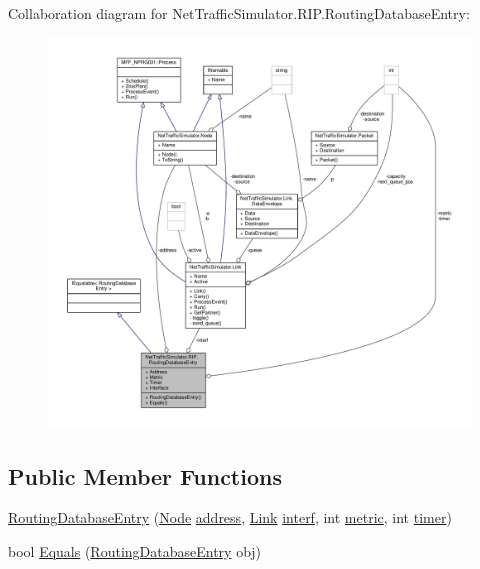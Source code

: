 Collaboration diagram for Net\-Traffic\-Simulator.\-R\-I\-P.\-Routing\-Database\-Entry\-:\nopagebreak
\begin{figure}[H]
\begin{center}
\leavevmode
\includegraphics[width=350pt]{classNetTrafficSimulator_1_1RIP_1_1RoutingDatabaseEntry__coll__graph}
\end{center}
\end{figure}
\subsection*{Public Member Functions}
\begin{DoxyCompactItemize}
\item 
\hyperlink{classNetTrafficSimulator_1_1RIP_1_1RoutingDatabaseEntry_afaa94cc84429fbf21ab78b77b3026627}{Routing\-Database\-Entry} (\hyperlink{classNetTrafficSimulator_1_1Node}{Node} \hyperlink{classNetTrafficSimulator_1_1RIP_1_1RoutingDatabaseEntry_acc483d92d46309fa5f08e45820f62784}{address}, \hyperlink{classNetTrafficSimulator_1_1Link}{Link} \hyperlink{classNetTrafficSimulator_1_1RIP_1_1RoutingDatabaseEntry_af8446afd63115da4ec4bc1efa484db2b}{interf}, int \hyperlink{classNetTrafficSimulator_1_1RIP_1_1RoutingDatabaseEntry_a82a8ca4b7eb56eb4b98675ab4cbc0c07}{metric}, int \hyperlink{classNetTrafficSimulator_1_1RIP_1_1RoutingDatabaseEntry_ac803f65d2cc853d6d663bb3336559b8b}{timer})
\item 
bool \hyperlink{classNetTrafficSimulator_1_1RIP_1_1RoutingDatabaseEntry_a0e8f2487a4ffb17b0109f80163469969}{Equals} (\hyperlink{classNetTrafficSimulator_1_1RIP_1_1RoutingDatabaseEntry}{Routing\-Database\-Entry} obj)
\end{DoxyCompactItemize}
